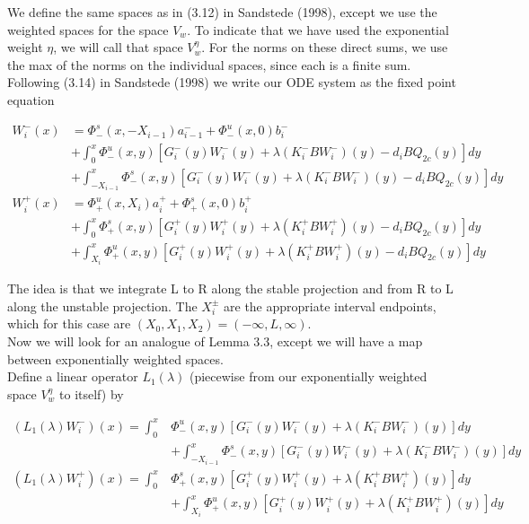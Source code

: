 \documentclass[12pt]{article}
\begin{document}
We define the same spaces as in (3.12) in Sandstede (1998), except we use the weighted spaces for the space $V_w$. To indicate that we have used the exponential weight $\eta$, we will call that space $V_w^\eta$. For the norms on these direct sums, we use the max of the norms on the individual spaces, since each is a finite sum.\\

Following (3.14) in Sandstede (1998) we write our ODE system as the fixed point equation

\begin{align*}
W_i^-(x) &= \Phi^s_-(x, -X_{i-1})a^-_{i-1} + \Phi^u_-(x, 0)b_i^- \\
&+ \int_0^x \Phi^u_-(x, y)[G_i^-(y) W_i^-(y) + \lambda (K_i^- B W_i^-)(y) - d_i B Q_{2c}(y) ] dy \\
&+ \int_{-X_{i-1}}^x \Phi^s_-(x, y)[G_i^-(y) W_i^-(y) + \lambda (K_i^-B W_i^-)(y) - d_i B Q_{2c}(y) ] dy \\
W_i^+(x) &= \Phi^u_+(x, X_i)a^+_{i} + \Phi^s_+(x, 0)b_i^+ \\
&+ \int_0^x \Phi^s_+(x, y)[G_i^+(y) W_i^+(y) + \lambda (K_i^+ B W_i^+)(y) - d_i B Q_{2c}(y) ] dy \\
&+ \int_{X_{i}}^x \Phi^u_+(x, y)[G_i^+(y) W_i^+(y) + \lambda (K_i^+ B W_i^+)(y) - d_i B Q_{2c}(y) ] dy
\end{align*}

The idea is that we integrate L to R along the stable projection and from R to L along the unstable projection. The $X_i^\pm$ are the appropriate interval endpoints, which for this case are $(X_0, X_1, X_2) = (-\infty, L, \infty)$.\\

Now we will look for an analogue of Lemma 3.3, except we will have a map between exponentially weighted spaces. \\

Define a linear operator $L_1(\lambda)$ (piecewise from our exponentially weighted space $V_w^\eta$ to itself) by

\begin{align*}
(L_1(\lambda)W_i^-)(x) = \int_0^x &\Phi^u_-(x, y)[G_i^-(y) W_i^-(y) + \lambda (K_i^- B W_i^-)(y) ] dy \\
&+ \int_{-X_{i-1}}^x \Phi^s_-(x, y)[G_i^-(y) W_i^-(y) + \lambda (K_i^-B W_i^-)(y) ] dy \\
(L_1(\lambda)W_i^+)(x) = \int_0^x &\Phi^s_+(x, y)[G_i^+(y) W_i^+(y) + \lambda (K_i^+ B W_i^+)(y)] dy \\
&+ \int_{X_{i}}^x \Phi^u_+(x, y)[G_i^+(y) W_i^+(y) + \lambda (K_i^+ B W_i^+)(y) ] dy
\end{align*}
\end{document}
